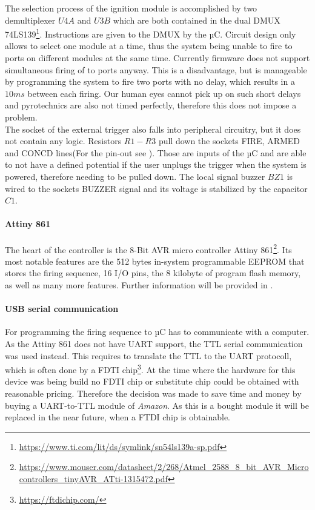 \noindent The selection process of the ignition module is accomplished by two demultiplexer $U4A$ and $U3B$ which are both contained in the dual DMUX 74LS139\footnote{\url{https://www.ti.com/lit/ds/symlink/sn54ls139a-sp.pdf}}. Instructions are given to the DMUX by the µC. Circuit design only allows to select one module at a time, thus the system being unable to fire to ports on different modules at the same time. Currently firmware does not support simultaneous firing of to ports anyway. This is a disadvantage, but is manageable by programming the system to fire two ports with no delay, which results in a $10ms$ between each firing. Our human eyes cannot pick up on such short delays and pyrotechnics are also not timed perfectly, therefore this does not impose a problem.\\

\noindent The socket of the external trigger also falls into peripheral circuitry, but  it does not contain any logic. Resistors $R1-R3$ pull down the sockets FIRE, ARMED and CONCD lines(For the pin-out see ). Those are inputs of the µC and are able to not have a defined potential if the user unplugs the trigger when the system is powered, therefore needing to be pulled down. The local signal buzzer $BZ1$ is wired to the sockets BUZZER signal and its voltage is stabilized by the capacitor $C1$.\\

\paragraph{Attiny 861}
The heart of the controller is the 8-Bit AVR micro controller Attiny 861\footnote{\url{https://www.mouser.com/datasheet/2/268/Atmel_2588_8_bit_AVR_Microcontrollers_tinyAVR_ATti-1315472.pdf}}. Its most notable features are the 512 bytes in-system programmable EEPROM that stores the firing sequence, 16 I/O pins, the 8 kilobyte of program flash memory, as well as many more features. Further information will be provided in .


\paragraph{USB serial communication}
For programming the firing sequence to µC has to communicate with a computer. As the Attiny 861 does not have UART support, the TTL serial communication was used instead. This requires to translate the TTL to the UART protocoll, which is often done by a FDTI chip\footnote{\url{https://ftdichip.com/}}. At the time where the hardware for this device was being build no FDTI chip or substitute chip could be obtained with reasonable pricing. Therefore the decision was made to save time and money by buying a UART-to-TTL module of \textit{Amazon}. As this is a bought module it will be replaced in the near future, when a FTDI chip is obtainable. \\

